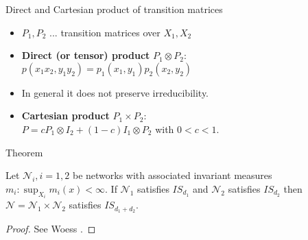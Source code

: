 \documentclass{beamer}\usepackage[]{graphicx}\usepackage[]{color}
\begin{document}
\begin{frame}[fragile]{Direct and Cartesian product of transition matrices}
\begin{itemize}
\item $P_1, P_2$ ... transition matrices over $X_1, X_2$
\item \textbf{Direct (or tensor) product} $P_1 \otimes P_2$:\\
$p(x_1 x_2, y_1 y_2) =  p_1(x_1, y_1)p_2(x_2, y_2)$
\item In general it does not preserve irreducibility.
\item \textbf{Cartesian product} $P_1 \times P_2$:\\
$P = c P_1 \otimes I_2 + (1 - c) I_1 \otimes P_2$ with $0<c<1$.
\end{itemize}
\end{frame}

\begin{frame}[fragile]{Theorem}
\begin{theorem}
Let $\mathcal{N}_i,i=1,2$ be networks with associated invariant measures $m_i: \sup_{X_i} m_i(x)<\infty$. If $\mathcal{N}_1$ satisfies $IS_{d_1}$ and $\mathcal{N}_2$ satisfies $IS_{d_2}$ then $\mathcal{N} = \mathcal{N}_1 \times \mathcal{N}_2$ satisfies $IS_{d_1+d_2}$.
\end{theorem}
\vspace{5mm}
\begin{proof}
See Woess \cite{woess2000}.
\end{proof}
\end{frame}

\end{document}
